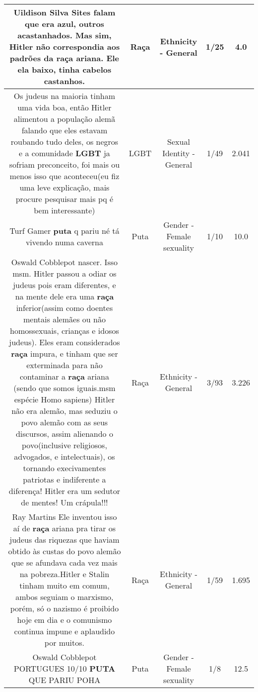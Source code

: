 \documentclass[11pt]{article}
\newlength\mylength
\begin{document}
\begin{center}
\begin{longtable}{|C{.65\mylength}|C{.30\mylength}|C{.12\mylength}|C{.12\mylength}|C{.12\mylength}|}
  \small Uildison Silva Sites falam que era azul, outros acastanhados. Mas sim, Hitler não correspondia aos padrões da \textbf{raça} ariana. Ele ela baixo, tinha cabelos castanhos.\normalsize   & Raça & Ethnicity - General & 1/25 & 4.0 \\  \hline
  \small Os judeus na maioria tinham uma vida boa, então Hitler alimentou a população alemã falando que eles estavam roubando tudo deles, os negros e a comunidade \textbf{LGBT} ja sofriam preconceito, foi mais ou menos isso que aconteceu(eu fiz uma leve explicação, mais procure pesquisar mais pq é bem interessante)\normalsize   & LGBT & Sexual Identity - General & 1/49 & 2.041 \\  \hline
  \small Turf Gamer \textbf{puta} q pariu né tá vivendo numa caverna\normalsize   & Puta & Gender - Female sexuality & 1/10 & 10.0 \\  \hline
  \small Oswald Cobblepot nascer. Isso msm. Hitler passou a odiar os judeus pois eram diferentes, e na mente dele era uma \textbf{raça} inferior(assim como doentes mentais alemães ou não homossexuais, crianças e idosos judeus). Eles eram considerados \textbf{raça} impura, e tinham que ser exterminada para não contaminar a \textbf{raça} ariana (sendo que somos iguais.msm espécie  Homo sapiens)  Hitler não era alemão, mas seduziu o povo alemão com as seus discursos, assim alienando o povo(inclusive religiosos, advogados, e intelectuais), os tornando execivamentes patriotas e indiferente a diferença! Hitler era um sedutor de mentes! Um crápula!!!\normalsize   & Raça & Ethnicity - General & 3/93 & 3.226 \\  \hline
  \small Ray Martins Ele inventou isso aí de \textbf{raça} ariana pra tirar os judeus das riquezas que haviam obtido às custas do povo alemão que se afundava cada vez mais na pobreza.Hitler e Stalin tinham muito em comum, ambos seguiam o marxismo, porém, só o nazismo é proibido hoje em dia e o comunismo continua impune e aplaudido por muitos.\normalsize   & Raça & Ethnicity - General & 1/59 & 1.695 \\  \hline
  \small Oswald Cobblepot PORTUGUES 10/10  \textbf{PUTA} QUE PARIU POHA\normalsize   & Puta & Gender - Female sexuality & 1/8 & 12.5 \\  \hline

\end{longtable}
\end{center}
\end{document}
